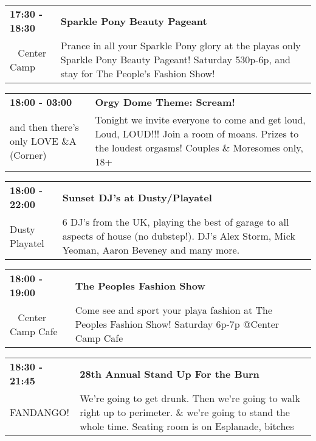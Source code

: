 \begin{tabular}{ p{1in} p{2.2in} }
    \textbf{17:30 - 18:30} & \textbf{Sparkle Pony Beauty Pageant } \\
    ~ \newline Center Camp & Prance in all your Sparkle Pony glory at the playas only Sparkle Pony Beauty Pageant! Saturday 530p-6p, and stay for The People's Fashion Show! \\
    \hline 
\end{tabular}
    
\begin{tabular}{ p{1in} p{2.2in} }
    \textbf{18:00 - 03:00} & \textbf{Orgy Dome Theme: Scream!} \\
    and then there's only LOVE \newline 4\&A (Corner) & Tonight we invite everyone to come and get loud, Loud, LOUD!!! Join a room of moans. Prizes to the loudest orgasms! Couples \& Moresomes only, 18+ \\
    \hline 
\end{tabular}
    
\begin{tabular}{ p{1in} p{2.2in} }
    \textbf{18:00 - 22:00} & \textbf{Sunset DJ's at Dusty/Playatel} \\
    Dusty Playatel \newline  & 6 DJ's from the UK, playing the best of garage to all aspects of house (no dubstep!). DJ's Alex Storm, Mick Yeoman, Aaron Beveney and many more. \\
    \hline 
\end{tabular}
    
\begin{tabular}{ p{1in} p{2.2in} }
    \textbf{18:00 - 19:00} & \textbf{The Peoples Fashion Show} \\
    ~ \newline Center Camp Cafe & Come see and sport your playa fashion at The Peoples Fashion Show! Saturday 6p-7p @Center Camp Cafe \\
    \hline 
\end{tabular}
    
\begin{tabular}{ p{1in} p{2.2in} }
    \textbf{18:30 - 21:45} & \textbf{28th Annual Stand Up For the Burn} \\
    FANDANGO! \newline  & We're going to get drunk. Then we're going to walk right up to perimeter. \& we're going to stand the whole time. Seating room is on Esplanade, bitches \\
    \hline 
\end{tabular}
    
